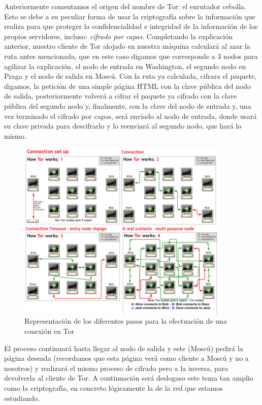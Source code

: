 \documentclass[a4paper, 11pt, titlepage]{article}
\begin{document}
    Anteriormente comentamos el origen del nombre de Tor: el enrutador cebolla. Esto se debe a su peculiar forma de usar 
    la criptografía sobre la información que realiza para que proteger la confidencialidad e integridad de la información 
    de los propios servidores, incluso: \emph{cifrado por capas}. Completando la explicación anterior, nuestro cliente de 
    Tor alojado en nuestra máquina calculará al azar la ruta antes mencionada, que en este caso digamos que corresponde a 
    3 nodos para agilizar la explicación, el nodo de entrada en Washington, el segundo nodo en Praga y el nodo de salida 
    en Moscú. Con la ruta ya calculada, cifrara el paquete, digamos, la petición de una simple página HTML con la clave 
    pública del nodo de salida, posteriormente volverá a cifrar el paquete ya cifrado con la clave pública del segundo nodo 
    y, finalmente, con la clave del nodo de entrada y, una vez terminado el cifrado por capas, será enviado al nodo de 
    entrada, donde usará su clave privada para descifrarlo y lo reenviará al segundo nodo, que hará lo mismo.
    
    \begin{figure}[htp]
        \centering
        \includegraphics[width=0.9\textwidth]{resources/torconn.png}
        \caption{Representación de los diferentes pasos para la efectuación de una conexión en Tor}
        \label{}
    \end{figure}
        
    El proceso continuará hasta llegar al nodo de salida y este (Moscú) pedirá la página deseada (recordamos que esta 
    página verá como cliente a Moscú y no a nosotros) y realizará el mismo proceso de cifrado pero a la inversa, para 
    devolverla al cliente de Tor. A continuación será deslogaso este tema tan amplio como la criptografía, en concreto 
    lógicamente la de la red que estamos estudiando.
\end{document}
